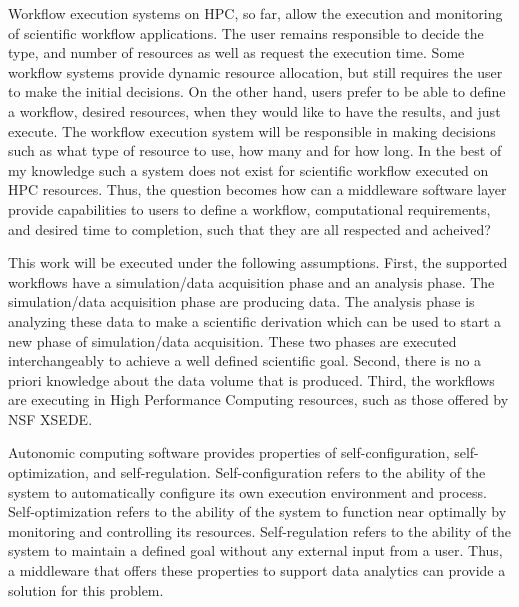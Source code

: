 Workflow execution systems on HPC, so far, allow the execution and monitoring of scientific workflow applications. The user remains responsible to decide the type, and number of resources as well as request the execution time. Some workflow systems provide dynamic resource allocation, but still requires the user to make the initial decisions.  On the other hand, users prefer to be able to define a workflow, desired resources, when they would like to have the results, and just execute. The workflow execution system will be responsible in making decisions such as what type of resource to use, how many and for how long. In the best of my knowledge such a system does not exist for scientific workflow executed on HPC resources. Thus, the question becomes how can a middleware software layer provide capabilities to users to define a workflow, computational requirements, and desired time to completion, such that they are all respected and acheived?


This work will be executed under the following assumptions. First, the supported workflows have a simulation/data acquisition phase and an analysis phase. The simulation/data acquisition phase are producing data. The analysis phase is analyzing these data to make a scientific derivation which can be used to start a new phase of simulation/data acquisition. These two phases are executed interchangeably to achieve a well defined scientific goal. Second, there is no a priori knowledge about the data volume that is produced. Third, the workflows are executing in High Performance Computing resources, such as those offered by NSF XSEDE.


Autonomic computing software provides properties of self-configuration, self-optimization, and self-regulation. Self-configuration refers to the ability of the system to automatically configure its own execution environment and process. Self-optimization refers to the ability of the system to function near optimally by monitoring and controlling its resources. Self-regulation refers to the ability of the system to maintain a defined goal without any external input from a user. Thus, a middleware that offers these properties to support data analytics can provide a solution for this problem.

